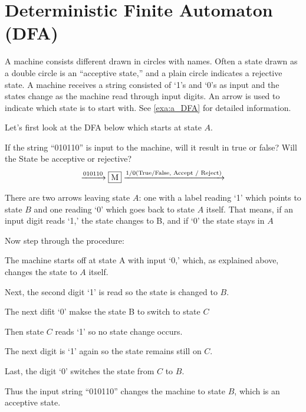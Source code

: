 
\section{Deterministic Finite Automaton (DFA)}

A machine consists different drawn in circles with names. Often a state drawn as
a double circle is an ``acceptive state,'' and a plain circle indicates a
rejective state. A machine receives a string consisted of `1's and `0's as input
and the states change as the machine read through input digits. An arrow is used
to indicate which state is to start with. See \autoref{exa:a_DFA} for detailed
information.

\begin{example}[A DFA]
    \label{exa:a_DFA}

    Let's first look at the DFA below which starts at state $A$.

    If the string ``010110'' is input to the machine, will it result in true or false?
    Will the State be acceptive or rejective?
    \[
        \xrightarrow{010110}
        \fbox{M}
        \xrightarrow{ 1/0 \text{(True/False, Accept / Reject)} }
    \]

    There are two arrows leaving state $A$: one with a label reading `1' which points to
    state $B$ and one reading `0' which goes back to state $A$ itself. That means, if an
    input digit reads `1,' the state changes to B, and if `0' the state stays in $A$

    Now step through the procedure:
    \begin{compactenum}
    \item
        The machine starts off at state A with input `0,' which, as explained above,
        changes the state to $A$ itself.
    \item
        Next, the second digit `1' is read so the state is changed to $B$.
    \item
        The next difit `0' makse the state B to switch to state $C$
    \item
        Then state $C$ reads `1' so no state change occurs.
    \item
        The next digit is `1' again so the state remains still on $C$.
    \item
        Last, the digit `0' switches the state from $C$ to $B$.
    \end{compactenum}
    Thus the input string ``010110'' changes the machine to state $B$, which is an
    acceptive state.

\end{example}


